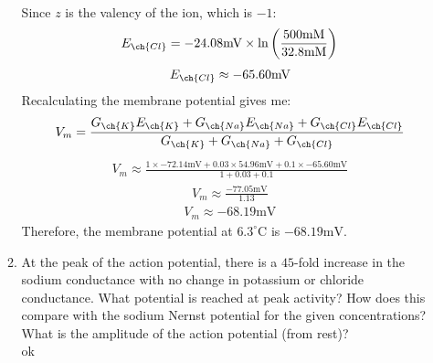 \documentclass[11pt]{article}
\begin{document}
\begin{enumerate}[label=\arabic*.]
\begin{enumerate}[label=\alph*.]
\begin{align*}
\end{align*}
Since $z$ is the valency of the  ion, which is $-1$:
\begin{align*}
E_{\ch{Cl}} = -24.08 \text{mV} \times \ln{\left(\frac{500 \text{mM}} {32.8 \text{mM}}\right)}
\end{align*}
\begin{align*}
E_{\ch{Cl}} \approx -65.60 \text{mV}
\end{align*}
Recalculating the membrane potential gives me:
\begin{align*}
V_m = \frac{G_{\ch{K}} E_{\ch{K}} + G_{\ch{Na}} E_{\ch{Na}} + G_{\ch{Cl}} E_{\ch{Cl}}} {G_{\ch{K}} + G_{\ch{Na}} + G_{\ch{Cl}}}
\end{align*}
\begin{align*}
V_m \approx \frac{1 \times -72.14 \text{mV} + 0.03 \times 54.96 \text{mV} + 0.1 \times -65.60 \text{mV}} {1 + 0.03 + 0.1}
\end{align*}
\begin{align*}
V_m \approx \frac{-77.05 \text{mV}} {1.13}
\end{align*}
\begin{align*}
V_m \approx -68.19 \text{mV}
\end{align*}
Therefore, the membrane potential at $6.3 ^{\circ}\text{C}$ is $-68.19 \text{mV}$.



\vspace*{1\baselineskip}
\item
At the peak of the action potential, there is a $45$-fold increase in the sodium conductance with no change in potassium or chloride conductance. What potential is reached at peak activity? How does this compare with the sodium Nernst potential for the given concentrations? What is the amplitude of the action potential (from rest)?
\vspace*{1\baselineskip}
\\
ok










\end{enumerate}




\end{enumerate}
\end{document}
